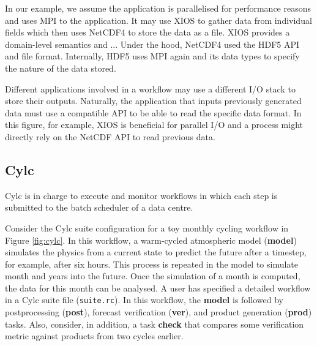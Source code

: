 \documentclass[a4paper]{article}
\newcommand{\jk}[1]{\todo[inline]{JK: #1}}
\begin{document}
\begin{minipage}{0.7\textwidth}
In our example, we assume the application is parallelised for performance reasons and uses MPI to \sout{{\color{blue}{coordinate}}} {\color{cyan}{run}} the application.
It may use XIOS to gather data from individual fields which then uses NetCDF4 to store the data as a file.
XIOS provides a domain-level semantics and ...\jk{TODO}
Under the hood, NetCDF4 used the HDF5 API and file format.
Internally, HDF5 uses MPI again and its data types to specify the nature of the data stored.
\sout{{\color{blue}{Finally, data is stored on a parallel file system like Lustre, which, on the server-side, stores data in a local file system that is stored on block devices and storage media such as SSDs and HDDs.}}}
{\color{cyan}{Finally, data is stored on a parallel file system like Lustre, which, on the server-side, stores data in local file system as block devices on storage media such as SSDs and HDDs.}}

Different applications involved in a workflow may use a different I/O stack to store their outputs.
Naturally, the application that inputs previously generated data must use a compatible API to be able to read the specific data format.
In this figure, for example, XIOS is beneficial for parallel I/O and a process might directly rely on the NetCDF API to read previous data.
\end{minipage}


\subsection{Cylc}

Cylc is in charge to execute and monitor workflows in which each step is submitted to the batch scheduler of a data centre.



Consider the Cylc suite configuration for a toy monthly cycling workflow in Figure \ref{fig:cylc}.
In this workflow, a warm-cycled atmospheric model (\textbf{model}) simulates the physics from a current state to predict the future after a timestep, for example, after six hours.
This process is repeated in the model to simulate month and years into the future.
Once the simulation of a month is computed, the data for this month can be analysed.
{\color{cyan}{This is wuite strange for me. It means that only after a month is completed one will use the information to start previsions? I would expect it to be more like a window-month than a fixed month, no?}}
A user has specified a detailed workflow in a Cylc suite file (\texttt{suite.rc}).
In this workflow, the \textbf{model} is followed by postprocessing (\textbf{post}), forecast verification (\textbf{ver}), and product generation (\textbf{prod}) tasks.
Also, consider, in addition, a task \textbf{check} that compares some verification metric against products from two cycles earlier.
\end{document}
